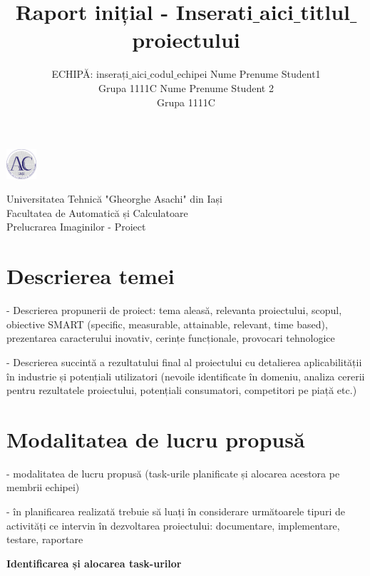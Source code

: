 \documentclass{article}
\title{Raport inițial - Inserati$\_$aici$\_$titlul$\_$proiectului}
\author{%
 ECHIPĂ: inserați$\_$aici$\_$codul$\_$echipei
 \AND
 Nume Prenume Student1 \\
 Grupa 1111C
 \AND
 Nume Prenume Student 2 \\
 Grupa 1111C
}
\begin{document}
\noindent\begin{minipage}{0.1\textwidth}%
\includegraphics[width=1.1cm]{imagini/logo_AC.png}
\end{minipage}%
\hfill%
\begin{minipage}{1\textwidth}\raggedright
Universitatea Tehnică "Gheorghe Asachi" din Iași\\
Facultatea de Automatică și Calculatoare\\
Prelucrarea Imaginilor - Proiect
\end{minipage}

\maketitle

\section{Descrierea temei}

- Descrierea propunerii de proiect: tema aleasă, relevanta proiectului, scopul, obiective SMART (specific, measurable, attainable, relevant,  time based), prezentarea caracterului inovativ, cerințe funcționale, provocari tehnologice

- Descrierea succintă a rezultatului final al proiectului cu detalierea aplicabilității în industrie și potențiali utilizatori (nevoile identificate în domeniu, analiza cererii pentru rezultatele proiectului, potențiali consumatori, competitori pe piață etc.)

\section{Modalitatea de lucru propusă}
- modalitatea de lucru propusă (task-urile planificate și alocarea acestora pe membrii echipei)

\color{red}

- în planificarea realizată trebuie să luați în considerare următoarele tipuri de activități ce intervin în dezvoltarea proiectului: documentare, implementare, testare, raportare

\color{black}

\textbf{Identificarea și alocarea task-urilor}
\end{document}
